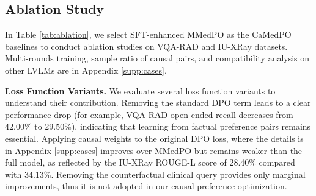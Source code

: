 \begin{table}[t]
\centering
\caption{Ablation study results on VQA-RAD and IU-XRay. “w/” and “w/o” denote with and without, respectively. $^\text{s}$ denotes the model enhanced with SFT.}
\label{tab:ablation}
\end{table}

\subsection{Ablation Study}
In Table \ref{tab:ablation}, we select SFT-enhanced MMedPO as the CaMedPO baselines to conduct ablation studies on VQA-RAD and IU-XRay datasets. Multi-rounds training, sample ratio of causal pairs, and compatibility analysis on other LVLMs are in Appendix \ref{supp:cases}.

\noindent\textbf{Loss Function Variants.}
We evaluate several loss function variants to understand their contribution. Removing the standard DPO term leads to a clear performance drop (for example, VQA-RAD open-ended recall decreases from 42.00\% to 29.50\%), indicating that learning from factual preference pairs remains essential. Applying causal weights to the original DPO loss, where the details is in Appendix \ref{supp:cases} improves over MMedPO but remains weaker than the full model, as reflected by the IU-XRay ROUGE-L score of 28.40\% compared 
with 34.13\%. Removing the counterfactual clinical query provides only marginal improvements, thus it is not adopted in our causal preference optimization.

